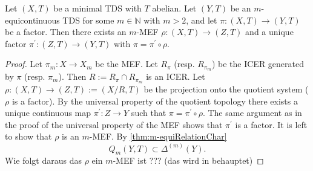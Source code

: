 \begin{theorem}
	Let $(X, T)$ be a minimal TDS with $T$ abelian.
	Let $(Y, T)$ be an $m$-equicontinuous TDS for some $m \in \mathbb{N}$ with $m > 2$, and let $\pi: (X,T) \to (Y,T)$ be a factor.
	Then there exists an $m$-MEF $\rho: (X,T) \to (Z,T)$ and a unique factor $\pi^\prime: (Z,T) \to (Y,T)$ with $\pi = \pi^\prime \circ \rho$.
\end{theorem}
\begin{proof}
	Let $\pi_m : X \to X_m$ be the MEF.
	Let $R_\pi$ (resp. $R_{\pi_m}$) be the ICER generated by $\pi$ (resp. $\pi_m$).
	Then $R:= R_\pi \cap R_{\pi_m}$ is an ICER.
	Let $\rho : (X,T) \to (Z,T):= (X/R,T)$ be the projection onto the quotient system ($\rho$ is a factor).
	By the universal property of the quotient topology there exists a unique continuous map $\pi^\prime :Z \to Y$ such that $\pi = \pi^\prime \circ \rho$.
	The same argument as in the proof of the universal property of the MEF shows that $\pi^\prime$ is a factor.
	It is left to show that $\rho$ is an $m$-MEF.
	By \cref{thm:m-equiRelationChar}
	\begin{equation*}
		Q_m(Y,T) \subset \Delta^{(m)}(Y).
	\end{equation*}
	{\color{red}Wie folgt daraus das $\rho$ ein $m$-MEF ist ??? (das wird in \cite{Garcia-Ramos2024} behauptet)}
\end{proof}
\begin{comment}
\begin{example}
	Fix $p \in \mathbb{N}$ and look at $(X \times \mathbb{Z}/p\mathbb{Z}, \mathbb{Z})$ from above. For $m \in \mathbb{N}$ with $m \geq 2$ all $m$-MEFs (up to isomorphism) of $(X \times \mathbb{Z}/p\mathbb{Z}, \mathbb{Z})$ are given by $(X \times \mathbb{Z}/q\mathbb{Z}, \mathbb{Z})$ for $q \in \mathbb{N}$ with $q < m$ and $q$ divides $p$. The corresponding factor map $\pi_{pq}: X \times \mathbb{Z}/p\mathbb{Z} \to X \times \mathbb{Z}/q\mathbb{Z}$ is given by
	\begin{align*}
		\pi_{pq}(x, z + p\mathbb{Z}) := (x, z + q\mathbb{Z})
	\end{align*}
	for all $(x, z + p\mathbb{Z}) \in X \times \mathbb{Z}/p\mathbb{Z}$. In particular the MEF is given by
	\begin{align*}
		(X \times \mathbb{Z}/1\mathbb{Z}, \mathbb{Z}) \cong (X, \mathbb{Z}).
	\end{align*}
\end{example}
\begin{proof}
	todo
\end{proof}
\end{comment}
